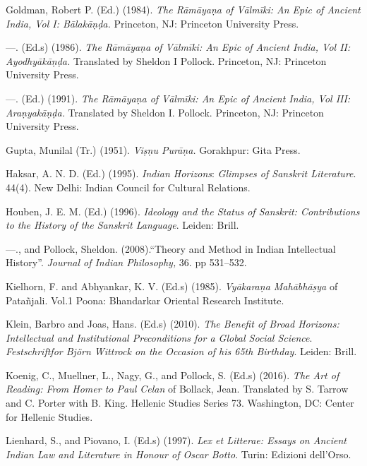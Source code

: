  \item Goldman, Robert P. (Ed.) (1984). \textit{The Rāmāyaṇa of Vālmīki: An Epic of Ancient India, Vol I: Bālakāṇḍa. }Princeton, NJ: Princeton University Press.

 \item —. (Ed.s) (1986).\textit{ The Rāmāyaṇa of Vālmīki: An Epic of Ancient India, Vol II: Ayodhyākāṇḍa. }Translated by Sheldon I Pollock. Princeton, NJ: Princeton University Press.

 \item —. (Ed.) (1991). \textit{The Rāmāyaṇa of Vālmīki: An Epic of Ancient India, Vol III: Araṇyakāṇḍa.} Translated by Sheldon I. Pollock. Princeton, NJ: Princeton University Press.

 \item Gupta, Munilal (Tr.) (1951). \textit{Viṣṇu Purāṇa.} Gorakhpur: Gita Press.

 \item Haksar, A. N. D. (Ed.) (1995). \textit{Indian Horizons}: \textit{Glimpses of Sanskrit Literature}. 44(4). New Delhi: Indian Council for Cultural Relations.

 \item Houben, J. E. M. (Ed.) (1996). \textit{Ideology and the Status of Sanskrit: Contributions to the History of the Sanskrit Language}. Leiden: Brill.

 \item —., and Pollock, Sheldon. (2008).“Theory and Method in Indian Intellectual History”.\textit{ Journal of Indian Philosophy, }36. pp 531–532.

 \item Kielhorn, F. and Abhyankar, K. V. (Ed.s) (1985). \textit{Vyākaraṇa Mahābhāṣya} of Patañjali. Vol.1 Poona: Bhandarkar Oriental Research Institute.

 \item Klein, Barbro and Joas, Hans. (Ed.s) (2010).\textit{ The Benefit of Broad Horizons: Intellectual and Institutional Preconditions for a Global Social Science}. \textit{Festschriftfor Björn Wittrock on the Occasion of his 65th Birthday}. Leiden: Brill.

 \item Koenig, C., Muellner, L., Nagy, G., and Pollock, S. (Ed.s) (2016). \textit{The Art of Reading: From Homer to Paul Celan} of Bollack, Jean. Translated by S. Tarrow and C. Porter with B. King. Hellenic Studies Series 73. Washington, DC: Center for Hellenic Studies.

 \item Lienhard, S., and Piovano, I. (Ed.s) (1997). \textit{Lex et Litterae: Essays on Ancient Indian Law and Literature in Honour of Oscar Botto}. Turin: Edizioni dell’Orso.

